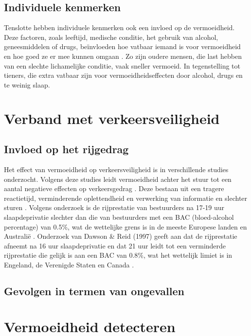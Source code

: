 \subsection{Individuele kenmerken}
Tenslotte hebben individuele kenmerken ook een invloed op de vermoeidheid. Deze factoren, zoals leeftijd, medische conditie, het gebruik van alcohol, geneesmiddelen of drugs, beïnvloeden hoe vatbaar iemand is voor vermoeidheid en hoe goed ze er mee kunnen omgaan \autocite{VanSchagen2003}. Zo zijn oudere mensen, die last hebben van een slechte lichamelijke conditie, vaak sneller vermoeid. In tegenstelling tot tieners, die extra vatbaar zijn voor vermoeidheidseffecten door alcohol, drugs en te weinig slaap.

\section{Verband met verkeersveiligheid}
\subsection{Invloed op het rijgedrag}
Het effect van vermoeidheid op verkeersveiligheid is in verschillende studies onderzocht. Volgens deze studies leidt vermoeidheid achter het stuur tot een aantal negatieve effecten op verkeersgedrag \autocite{RiguelleGoldenbeld}. Deze bestaan uit een tragere reactietijd, verminderende oplettendheid en verwerking van informatie en slechter sturen \autocite{Bartlett,Friswell2008}. Volgens onderzoek is de rijprestatie van bestuurders na 17-19 uur slaapdeprivatie slechter dan die van bestuurders met een BAC (bloed-alcohol percentage) van 0.5\%, wat de wettelijke grens is in de meeste Europese landen en Australië \autocite{Williamson2000}. Onderzoek van Dawson \& Reid (1997) geeft aan dat de rijprestatie afneemt na 16 uur slaapdeprivatie en dat 21 uur leidt tot een verminderde rijprestatie die gelijk is aan een BAC van 0.8\%, wat het wettelijk limiet is in Engeland, de Verenigde Staten en Canada \autocite{Dawson1997}.
\subsection{Gevolgen in termen van ongevallen}

\section{Vermoeidheid detecteren}
